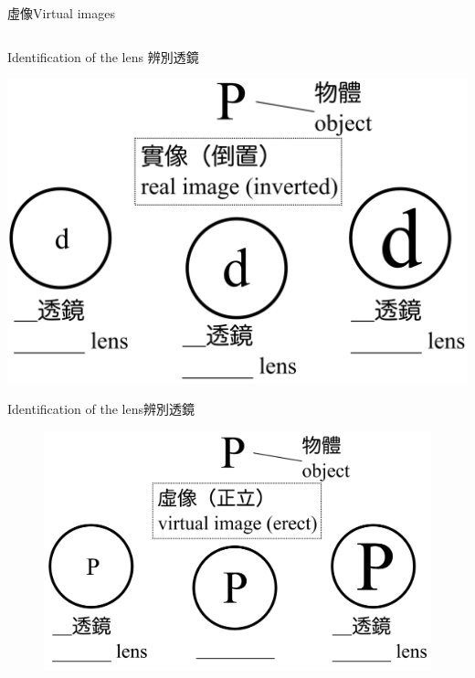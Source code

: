 \documentclass[beamer=true]{standalone}
\begin{document}
\begin{frame}{虛像Virtual images}
\begin{columns}
    \end{columns}
\end{frame}

\begin{frame}
    {Identification of the lens 辨別透鏡}
    \par{\par\centering\includegraphics[width=\textwidth]{assets/1133445.png}\par}
\end{frame}
\begin{frame}
    {Identification of the lens辨別透鏡}
    \begin{figure}
        \centering
        \includegraphics[width=1\linewidth]{assets/dedn2189u328n2.png}
    \end{figure}
\end{frame}
\end{document}
